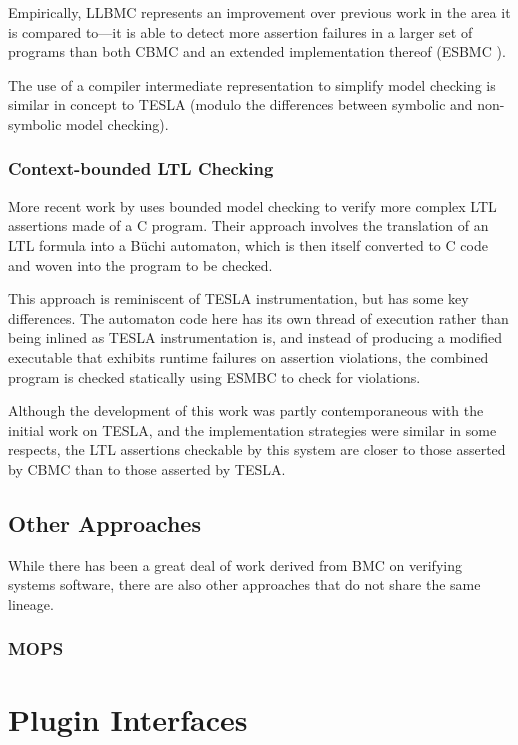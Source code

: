 Empirically, LLBMC represents an improvement over previous work in the
area it is compared to---it is able to detect more assertion failures in
a larger set of programs than both CBMC and an extended implementation
thereof (ESBMC \cite{cordeiro_smt-based_2009}).

The use of a compiler intermediate representation to simplify model
checking is similar in concept to TESLA (modulo the differences between
symbolic and non-symbolic model checking).

\subsubsection{Context-bounded LTL Checking}

More recent work by \textcite{morse_context-bounded_2011,
morse_model_2015-1} uses bounded model checking to verify more complex
LTL assertions made of a C program. Their approach involves the
translation of an LTL formula into a B\"uchi automaton, which is then
itself converted to C code and woven into the program to be checked.

This approach is reminiscent of TESLA instrumentation, but has some key
differences. The automaton code here has its own thread of execution
rather than being inlined as TESLA instrumentation is, and instead of
producing a modified executable that exhibits runtime failures on
assertion violations, the combined program is checked statically using
ESMBC to check for violations.

Although the development of this work was partly contemporaneous with
the initial work on TESLA, and the implementation strategies were
similar in some respects, the LTL assertions checkable by this system
are closer to those asserted by CBMC than to those asserted by TESLA.

\subsection{Other Approaches}

While there has been a great deal of work derived from BMC on verifying
systems software, there are also other approaches that do not share the
same lineage.

\subsubsection{MOPS}


\section{Plugin Interfaces}

